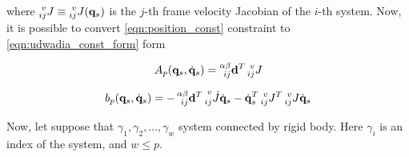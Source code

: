 where $\prescript{v}{ij}{J} \equiv \prescript{v}{ij}{J}(\mathbf{q}_s)$ is the 
$j$-th frame velocity Jacobian of the $i$-th system. Now, it is possible to 
convert \ref{eqn:position_const} constraint to \ref{eqn:udwadia_const_form} form

\begin{equation}
    \label{eqn:pos_const_a_matrix}
    A_p(\mathbf{q}_s, \dot{\mathbf{q}}_s) = 
    \prescript{\alpha \beta}{ij}{\mathbf{d}}^T \prescript{v}{ij}{J}
\end{equation}

\begin{equation}
    \label{eqn:pos_const_b_vector}
    b_p(\mathbf{q}_s, \dot{\mathbf{q}}_s) = 
    - \prescript{\alpha \beta}{ij}{\mathbf{d}}^T 
    \prescript{v}{ij}{\dot{J}} \dot{\mathbf{q}}_s
    - \dot{\mathbf{q}}_s^T \prescript{v}{ij}{J}^T
    \prescript{v}{ij}{J} \dot{\mathbf{q}}_s
\end{equation}

Now, let suppose that $\gamma_1, \gamma_2, \dots, \gamma_w$ system connected by rigid 
body. Here $\gamma_i$ is an index of the system, and $w \leq p$. 
